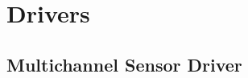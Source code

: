 \documentclass[12pt]{article}
\numberwithin{subsubsubsection}{subsubsection}
\begin{document}
\begin{figure}[H]
    \centering
\end{figure}
\newpage















\section{Drivers}
\label{appendix:driverdevelopment}

\subsection{Multichannel Sensor Driver}
\end{document}
